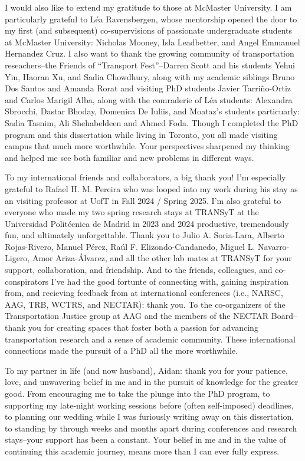 \documentclass[
11pt, %
oneside, %
english, %
singlespacing, %
]{macthesis} %
\begin{document}
\begin{acknowledgements}
    I would also like to extend my gratitude to those at McMaster University. I am particularly grateful to Léa Ravensbergen, whose mentorship opened the door to my first (and subsequent) co-supervisions of passionate undergraduate students at McMaster University: Nicholas Mooney, Isla Leadbetter, and Angel Emmanuel Hernandez Cruz. I also want to thank the growing community of transportation reseachers--the Friends of ``Transport Fest''--Darren Scott and his students Yehui Yin, Haoran Xu, and Sadia Chowdhury, along with my academic siblings Bruno Dos Santos and Amanda Rorat and visiting PhD students Javier Tarriño-Ortiz and Carlos Marigil Alba, along with the comraderie of Léa students: Alexandra Sbrocchi, Dastar Bhoday, Domenica De Iuliis, and Moataz's students particuarly: Sadia Tasnim, Ali Shehabeldeen and Ahmed Foda. Though I completed the PhD program and this dissertation while living in Toronto, you all made visiting campus that much more worthwhile. Your perspectives sharpened my thinking and helped me see both familiar and new problems in different ways.

    To my international friends and collaborators, a big thank you! I'm especially grateful to Rafael H. M. Pereira who was looped into my work during his stay as an visiting professor at UofT in Fall 2024 / Spring 2025. I'm also grateful to everyone who made my two spring research stays at TRANSyT at the Universidad Politécnica de Madrid in 2023 and 2024 productive, tremendously fun, and ultimately unforgettable. Thank you to Julio A. Soria-Lara, Alberto Rojas-Rivero, Manuel Pérez, Raúl F. Elizondo-Candanedo, Miguel L. Navarro-Ligero, Amor Ariza-Álvarez, and all the other lab mates at TRANSyT for your support, collaboration, and friendship. And to the friends, colleagues, and co-conspirators I've had the good fortunte of connecting with, gaining inspiration from, and recieving feedback from at international conferences (i.e., NARSC, AAG, TRB, WCTRS, and NECTAR): thank you. To the co-organizers of the Transportation Justice group at AAG and the members of the NECTAR Board--thank you for creating spaces that foster both a passion for advancing transportation research and a sense of academic community. These international connections made the pursuit of a PhD all the more worthwhile.

    To my partner in life (and now husband), Aidan: thank you for your patience, love, and unwavering belief in me and in the pursuit of knowledge for the greater good. From encouraging me to take the plunge into the PhD program, to supporting my late-night working sessions before (often self-imposed) deadlines, to planning our wedding while I was furiously writing away on this dissertation, to standing by through weeks and months apart during conferences and research stays--your support has been a constant. Your belief in me and in the value of continuing this academic journey, means more than I can ever fully express.


\end{acknowledgements}
\end{document}
